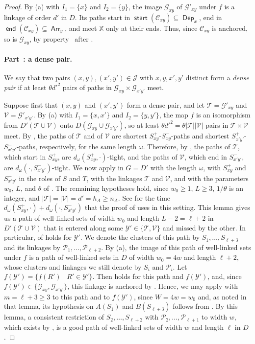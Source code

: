 \documentclass[fontsize=12pt,leading=14pt]{fullpaper}
\DeclareMathOperator{\st}{\mathsf{start}}
\DeclareMathOperator{\en}{\mathsf{end}}
\DeclareMathOperator{\Arr}{\mathsf{Arr}}
\DeclareMathOperator{\Dep}{\mathsf{Dep}}
\newcommand{\Ccal}{\mathcal{C}}
\newcommand{\Gcal}{\mathcal{G}}
\newcommand{\Jcal}{\mathcal{J}}
\newcommand{\Pcal}{\mathcal{P}}
\newcommand{\Tcal}{\mathcal{T}}
\newcommand{\Vcal}{\mathcal{V}}
\newcommand{\Ycal}{\mathcal{Y}}
\newcommand{\XX}{\mathbb{X}}
\newcounter{step}
\newcounter{proofstep}[section]
\newcommand{\proofstep}[2]{%
\paragraph*{\refstepcounter{proofstep}\label{#1}Part~\theproofstep: #2}}
\begin{document}
\begin{proof}
  By (a) with $I_1=\{x\}$ and $I_2=\{y\}$, the image $\Gcal_{xy}$ of $\Gcal'_{xy}$ under $f$ is a linkage of order $d'$ in $D$.
  Its paths start in $\st(\Ccal_{xy})\subseteq\Dep_x$, end in $\en(\Ccal_{xy})\subseteq\Arr_y$, and meet $\XX$ only at their ends.
  Thus, since $\Ccal_{xy}$ is anchored, so is $\Gcal_{xy}$, by property~ after .

  \proofstep{part:core-4}{a dense pair.}
  We say that two pairs $(x,y),(x',y')\in\Jcal$ with $x,y,x',y'$ distinct form a \emph{dense pair} if at least $\theta d'^2$ pairs of paths in $\Gcal_{xy}\times\Gcal_{x'y'}$ meet.

  Suppose first that $(x,y)$ and $(x',y')$ form a dense pair, and let $\Tcal=\Gcal'_{xy}$ and $\Vcal=\Gcal'_{x'y'}$.
  By (a) with $I_1=\{x,x'\}$ and $I_2=\{y,y'\}$, the map $f$ is an isomorphism from $D'(\Tcal\cup\Vcal)$ onto $D(\Gcal_{xy}\cup\Gcal_{x'y'})$, so at least $\theta d'^2=\theta|\Tcal||\Vcal|$ pairs in $\Tcal\times\Vcal$ meet.
  By , the paths of $\Tcal$ and of $\Vcal$ are shortest $S^+_{xy}$-$S^-_{xy}$-paths and shortest $S^+_{x'y'}$-$S^-_{x'y'}$-paths, respectively, for the same length $\omega$.
  Therefore, by , the paths of $\Tcal$, which start in $S^+_{xy}$, are $d_\omega(S^+_{xy},\cdot)$-tight, and the paths of $\Vcal$, which end in $S^-_{x'y'}$, are $d_\omega(\cdot,S^-_{x'y'})$-tight.
  We now apply  in $G=D'$ with the length $\omega$, with $S^+_{xy}$ and $S^-_{x'y'}$ in the roles of $S$ and $T$, with the linkages $\Tcal$ and $\Vcal$, and with the parameters $w_0$, $L$, and $\theta$ of .
  The remaining hypotheses hold, since $w_0\ge1$, $L\ge3$, $1/\theta$ is an integer, and $|\Tcal|=|\Vcal|=d'=h_A\ge n_A$.
  See  for the time $d_\omega(S^+_{xy},\cdot)+d_\omega(\cdot,S^-_{x'y'})$ that the proof of  uses in this setting.
  This lemma gives us a path of well-linked sets of width $w_0$ and length $L-2=\ell+2$ in $D'(\Tcal\cup\Vcal)$ that is entered along some $\Ycal'\in\{\Tcal,\Vcal\}$ and missed by the other.
  In particular,  of  holds for $\Ycal'$.
  We denote the clusters of this path by $S_1,\dots,S_{\ell+3}$ and its linkages by $\Pcal_1,\dots,\Pcal_{\ell+2}$.
  By (a), the image of this path of well-linked sets under $f$ is a path of well-linked sets in $D$ of width $w_0=4w$ and length $\ell+2$, whose clusters and linkages we still denote by $S_i$ and $\Pcal_i$.
  Let $f(\Ycal')=\{f(R')\mid R'\in\Ycal'\}$.
  Then  holds for this path and $f(\Ycal')$, and, since $f(\Ycal')\in\{\Gcal_{xy},\Gcal_{x'y'}\}$, this linkage is anchored by .
  Hence, we may apply  with $m=\ell+3\ge3$ to this path and to $f(\Ycal')$, since $W=4w=w_0$ and, as noted in that lemma, its hypothesis on $A(S_1)$ and $B(S_{\ell+3})$ follows from .
  By this lemma, a consistent restriction of $S_2,\dots,S_{\ell+2}$ with $\Pcal_2,\dots,\Pcal_{\ell+1}$ to width $w$, which exists by , is a good path of well-linked sets of width $w$ and length $\ell$ in $D$.


\end{proof}
\end{document}
